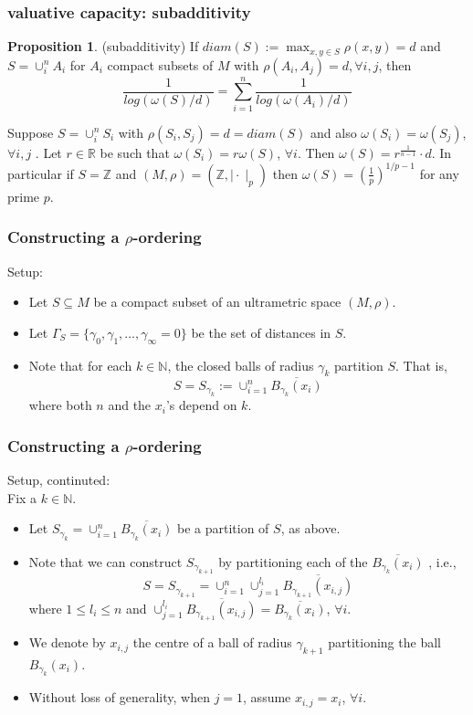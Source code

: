 \documentclass{beamer}
\theoremstyle{definition}
\newtheorem*{proposition*}{Proposition}
\begin{document}
\begin{frame}
\frametitle{valuative capacity: subadditivity}

\begin{proposition*}
\cite{kj}(subadditivity) If  $diam(S) := \max_{x,y \in S} \rho(x,y)=d$ and $S=\cup_i^n A_i$ for $A_i$ compact subsets of $M$ with $\rho(A_i, A_j)=d, \forall i,j$, then \[\frac{1}{log(\omega(S)/d) } = \sum_{i=1}^n \frac{1}{log(\omega(A_i)/d)}\] 
\end{proposition*}

\begin{corollary}
Suppose $S = \cup_i^n S_i$ with $\rho(S_i, S_j)=d=diam(S)$ and also $\omega(S_i)=\omega(S_j)$, $\forall i,j$ .  Let $r \in \mathbb{R}$ be such that $\omega(S_i)=r\omega(S)$, $\forall i$. Then $\omega(S) = r^{\frac{1}{n-1}}\cdot d$. In particular if $S = \mathbb{Z}$ and $(M,\rho)= (\mathbb{Z}, \mid \cdot\mid_p)$ then $\omega(S)=(\frac{1}{p})^{1/p-1}$ for any prime $p$. 
\end{corollary}
\end{frame}



\begin{frame}
\frametitle{Constructing a $\rho$-ordering}
Setup:
\begin{itemize}
\item Let $S \subseteq M$ be a compact subset of an ultrametric space $(M, \rho)$. 
\item Let $\Gamma_S =\{\gamma_0, \gamma_1,\ldots,\gamma_\infty=0\}$ be the set of distances in $S$.  
\item Note that for each $k \in \mathbb{N}$, the closed balls of radius $\gamma_k$ partition $S$. That is, \[S=S_{\gamma_k} := \cup_{i=1}^n \overline{B_{\gamma_k}(x_i)}\] where both $n$ and the $x_i$'s depend on $k$.
\end{itemize}

\end{frame}

\begin{frame}
\frametitle{Constructing a $\rho$-ordering}
Setup, continuted:
\\Fix a $k \in \mathbb{N}$. 
\begin{itemize}
\item Let $S_{\gamma_k} = \cup_{i=1}^n \overline{B_{\gamma_k}(x_i)}$ be  a partition of $S$, as above. 
 \item Note that we can construct $S_{\gamma_{k+1}}$ by partitioning each of the $\overline{B_{\gamma_k}(x_i)}$ , i.e., \[S = S_{\gamma_{k+1}} = \cup_{i=1}^n \cup_{j=1}^{l_i} \overline{B_{\gamma_{k+1}}(x_{i,j})}\] where $1 \leq l_i \leq n$ and $\cup_{j=1}^{l_i} \overline{B_{\gamma_{k+1}}(x_{i,j})}=\overline{B_{\gamma_k}(x_i)}$, $\forall i$. 
\item We denote by $x_{i,j}$ the centre of a ball of radius $\gamma_{k+1}$ partitioning the ball $B_{\gamma_k}(x_i)$. \item Without loss of generality, when $j=1$, assume $x_{i,j}=x_i$, $\forall i$.\\
\end{itemize}

\end{frame}
\end{document}
